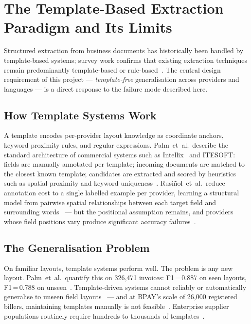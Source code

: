 \section{The Template-Based Extraction Paradigm and Its Limits}
\label{sec:bg-templates}
 
Structured extraction from business documents has historically been
handled by template-based systems; survey work confirms that existing
extraction techniques remain predominantly template-based or
rule-based~\cite{Baviskar2021Automated}.
The central design requirement of this project ---
\textit{template-free} generalisation across providers and languages
--- is a direct response to the failure mode described here.
 
\subsection{How Template Systems Work}
\label{subsec:bg-template-arch}
 
A template encodes per-provider layout knowledge as coordinate anchors,
keyword proximity rules, and regular expressions.
Palm~et~al.\ describe the standard architecture of commercial systems
such as Intellix~\cite{Schuster2013Intellix} and ITESOFT: fields are
manually annotated per template; incoming documents are matched to the
closest known template; candidates are extracted and scored by heuristics
such as spatial proximity and keyword
uniqueness~\cite{Palm2017CloudScan}.
Rusi\~{n}ol~et~al.\ reduce annotation cost to a single labelled example
per provider, learning a structural model from pairwise spatial
relationships between each target field and surrounding
words~\cite{Rusinol2013Templates} --- but the positional assumption
remains, and providers whose field positions vary produce significant
accuracy failures~\cite{Rusinol2013Templates}.
 
\subsection{The Generalisation Problem}
\label{subsec:bg-template-limits}
 
On familiar layouts, template systems perform well.
The problem is any new layout.
Palm~et~al.\ quantify this on 326,471 invoices: F1\,=\,0.887 on seen
layouts, F1\,=\,0.788 on
unseen~\cite{Palm2017CloudScan}.
Template-driven systems cannot reliably or automatically generalise to
unseen field layouts~\cite{Holt2018Invoices} --- and at BPAY's scale
of 26,000 registered billers, maintaining templates manually is not
feasible~\cite{Holt2018Invoices}.
Enterprise supplier populations routinely require hundreds to thousands
of templates~\cite{Krieger2021GNN}.
 
